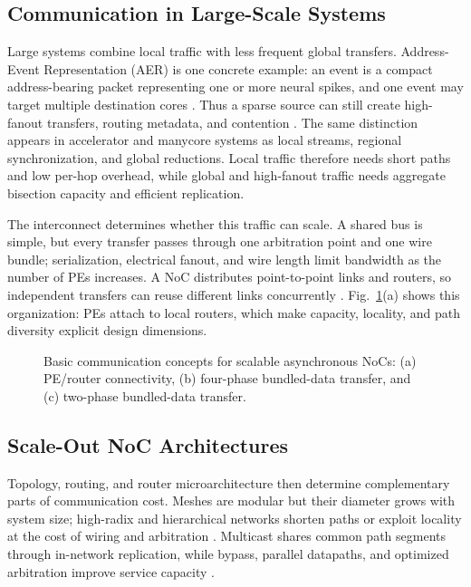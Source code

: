 \documentclass[conference]{IEEEtran}
\begin{document}
\subsection{Communication in Large-Scale Systems}\label{sec:large-scale-communication}

Large systems combine local traffic with less frequent global transfers.
Address-Event Representation (AER) is one concrete example: an event is a
compact address-bearing packet representing one or more neural spikes, and
one event may target multiple destination cores
\cite{moradi2018dynaps,merolla2014tree}. Thus a sparse source can still create
high-fanout transfers, routing metadata, and contention
\cite{su2025hbs}. The same distinction appears in accelerator and manycore
systems as local streams, regional synchronization, and global reductions.
Local traffic therefore needs short paths and low per-hop overhead, while
global and high-fanout traffic needs aggregate bisection capacity and
efficient replication.

The interconnect determines whether this traffic can scale. A shared bus is
simple, but every transfer passes through one arbitration point and one wire
bundle; serialization, electrical fanout, and wire length limit bandwidth as
the number of PEs increases. A NoC distributes point-to-point links and
routers, so independent transfers can reuse different links concurrently
\cite{dally2004book,krishna2013smart}. Fig.~\ref{fig:basic-concepts}(a)
shows this organization: PEs attach to local routers, which make capacity,
locality, and path diversity explicit design dimensions.

\begin{figure}[!t]
\centering

\caption{Basic communication concepts for scalable asynchronous NoCs:
(a) PE/router connectivity, (b) four-phase bundled-data transfer, and
(c) two-phase bundled-data transfer.}
\label{fig:basic-concepts}
\end{figure}

\subsection{Scale-Out NoC Architectures}\label{sec:scaleout-bg}

Topology, routing, and router microarchitecture then determine complementary
parts of communication cost. Meshes are modular but their diameter grows
with system size; high-radix and hierarchical networks shorten paths or
exploit locality at the cost of wiring and arbitration
\cite{zhong2025paicore}. Multicast shares common path segments through
in-network replication, while bypass, parallel datapaths, and optimized
arbitration improve service capacity
\cite{merolla2014tree,bhardwaj2019cmr,su2025hbs,krishna2013smart,rasheed2014storm,fischer2025floonoc}.
\end{document}
